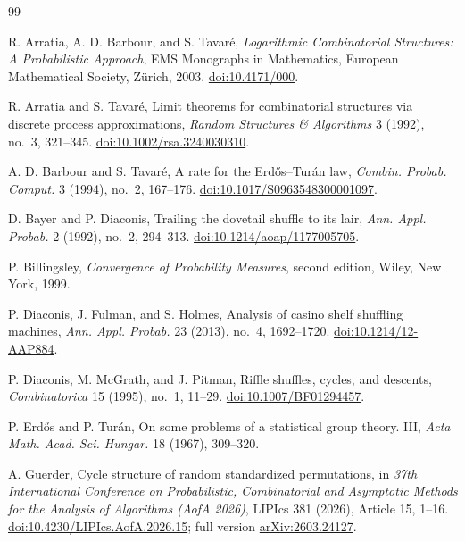 \documentclass[11pt]{article}
\theoremstyle{definition}
\theoremstyle{remark}
\begin{document}
\begin{thebibliography}{99}

R. Arratia, A. D. Barbour, and S. Tavar\'e,
\newblock \emph{Logarithmic Combinatorial Structures: A Probabilistic
Approach},
\newblock EMS Monographs in Mathematics, European Mathematical Society,
Z\"urich, 2003.
\newblock \href{https://doi.org/10.4171/000}{doi:10.4171/000}.

R. Arratia and S. Tavar\'e,
\newblock Limit theorems for combinatorial structures via discrete process
approximations,
\newblock \emph{Random Structures \& Algorithms} 3 (1992), no.~3, 321--345.
\newblock \href{https://doi.org/10.1002/rsa.3240030310}
{doi:10.1002/rsa.3240030310}.

A. D. Barbour and S. Tavar\'e,
\newblock A rate for the Erd\H{o}s--Tur\'an law,
\newblock \emph{Combin. Probab. Comput.} 3 (1994), no.~2, 167--176.
\newblock \href{https://doi.org/10.1017/S0963548300001097}
{doi:10.1017/S0963548300001097}.

D. Bayer and P. Diaconis,
\newblock Trailing the dovetail shuffle to its lair,
\newblock \emph{Ann. Appl. Probab.} 2 (1992), no.~2, 294--313.
\newblock \href{https://doi.org/10.1214/aoap/1177005705}
{doi:10.1214/aoap/1177005705}.

P. Billingsley,
\newblock \emph{Convergence of Probability Measures},
\newblock second edition, Wiley, New York, 1999.

P. Diaconis, J. Fulman, and S. Holmes,
\newblock Analysis of casino shelf shuffling machines,
\newblock \emph{Ann. Appl. Probab.} 23 (2013), no.~4, 1692--1720.
\newblock \href{https://doi.org/10.1214/12-AAP884}
{doi:10.1214/12-AAP884}.

P. Diaconis, M. McGrath, and J. Pitman,
\newblock Riffle shuffles, cycles, and descents,
\newblock \emph{Combinatorica} 15 (1995), no.~1, 11--29.
\newblock \href{https://doi.org/10.1007/BF01294457}
{doi:10.1007/BF01294457}.

P. Erd\H{o}s and P. Tur\'an,
\newblock On some problems of a statistical group theory. III,
\newblock \emph{Acta Math. Acad. Sci. Hungar.} 18 (1967), 309--320.

A. Guerder,
\newblock Cycle structure of random standardized permutations,
\newblock in \emph{37th International Conference on Probabilistic,
Combinatorial and Asymptotic Methods for the Analysis of Algorithms
(AofA 2026)}, LIPIcs 381 (2026), Article 15, 1--16.
\newblock \href{https://doi.org/10.4230/LIPIcs.AofA.2026.15}
{doi:10.4230/LIPIcs.AofA.2026.15};
full version \href{https://arxiv.org/abs/2603.24127}{arXiv:2603.24127}.


\end{thebibliography}
\end{document}
